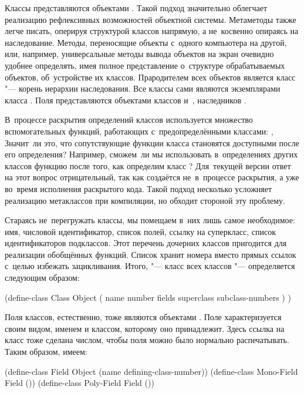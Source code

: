 Классы {\Meroonet} представляются объектами {\Meroonet}. Такой подход
значительно облегчает реализацию рефлексивных возможностей объектной системы.
Метаметоды также легче писать, оперируя структурой классов напрямую, а
не~косвенно опираясь на наследование. Методы, переносящие объекты с~одного
компьютера на другой, или, например, универсальные методы вывода объектов
на экран очевидно удобнее определять, имея полное представление о~структуре
обрабатываемых объектов, об~устройстве их классов. Прародителем всех объектов
является класс  "--- корень иерархии наследования. Все классы сами
являются экземплярами класса . Поля представляются объектами классов
 и~, наследников .

В~процессе раскрытия определений классов используется множество вспомогательных
функций, работающих с~предопределёнными классами: ,
 {\itd} Значит~ли это, что сопутствующие функции класса
становятся доступными после его определения? Например, сможем~ли мы использовать
в~определениях других классов функцию  после того, как определим
класс ? Для~текущей версии  ответ на этот вопрос
отрицательный, так как  создаётся не~в~процессе раскрытия, а уже
во~время исполнения раскрытого кода. Такой подход несколько усложняет реализацию
метаклассов при компиляции, но {\Meroonet} обходит стороной эту проблему.

Стараясь не~перегружать классы, мы помещаем в~них лишь самое необходимое: имя,
числовой идентификатор, список полей, ссылку на суперкласс, список
идентификаторов подклассов. Этот перечень дочерних классов пригодится для
реализации обобщённых функций. Список хранит номера вместо прямых ссылок
с~целью избежать зацикливания. Итого,  "--- класс всех классов "---
определяется следующим образом:

\begin{code:lisp}
(define-class Class Object
  ( name number fields superclass subclass-numbers ) )
\end{code:lisp}

Поля классов, естественно, тоже являются объектами {\Meroonet}. Поле
характеризуется своим видом, именем и классом, которому оно принадлежит. Здесь
ссылка на класс тоже сделана числом, чтобы поля можно было нормально
распечатывать. Таким образом, имеем:

\begin{code:lisp}
(define-class Field Object (name defining-class-number))
(define-class Mono-Field Field ())
(define-class Poly-Field Field ())
\end{code:lisp}

